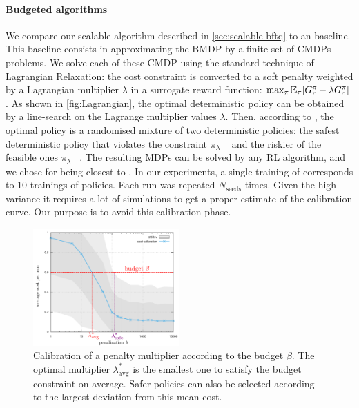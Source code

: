 \paragraph{Budgeted algorithms}\label{par:ex-brl} We compare our  scalable \BFTQ algorithm described in \autoref{sec:scalable-bftq} to an \FTQl baseline. This baseline consists in approximating the BMDP by a finite set of CMDPs problems. We solve each of these CMDP using the standard technique of Lagrangian Relaxation: the cost constraint is converted to a soft penalty weighted by a Lagrangian multiplier $\lambda$ in a surrogate reward function: $\max_{\pi} \operatorname*{\mathbb{E}}_{\pi}[G_r^\pi - \lambda G_c^\pi]$.
As shown in \autoref{fig:Lagrangian}, the optimal deterministic policy can be obtained by a line-search on the Lagrange multiplier values $\lambda$.
Then, according to \citet[Theorem 4.4]{BEUTLER1985236}, the optimal policy is a randomised mixture of two deterministic policies: the safest deterministic policy that violates the constraint $\pi_{\lambda-}$ and the riskier of the feasible ones $\pi_{\lambda+}$.
The resulting MDPs can be solved by any RL algorithm, and we chose \FTQ for being closest to \BFTQ.
In our experiments, a single training of \BFTQ corresponds to 10 trainings of \FTQl policies. Each run was repeated $N_{\text{seeds}}$ times. Given the high variance it requires a lot of simulations to get a proper estimate of the calibration curve. Our purpose is to avoid this calibration phase.

\begin{figure}[tp]
	\centering
	\includegraphics[width=0.5\textwidth]{img/CalibrationExample}
	\caption{Calibration of a penalty multiplier according to the budget $\beta$. The optimal multiplier $\lambda^*_{\text{avg}}$ is the smallest one to satisfy the budget constraint on average. Safer policies can also be selected according to the largest deviation from this mean cost.}
	\label{fig:Lagrangian}
\end{figure}


